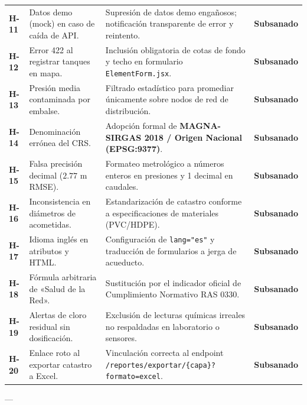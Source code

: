 \documentclass[11pt,letterpaper]{article}
\begin{document}
\begin{tabularx}{\textwidth}{p{1.2cm}p{4.2cm}p{6.8cm}c}
\rowcolor{LightGray}
\textbf{H-11} & Datos demo (mock) en caso de caída de API. & Supresión de datos demo engañosos; notificación transparente de error y reintento. & \textcolor{AlertGreen}{\textbf{Subsanado}} \\
\textbf{H-12} & Error 422 al registrar tanques en mapa. & Inclusión obligatoria de cotas de fondo y techo en formulario \texttt{ElementForm.jsx}. & \textcolor{AlertGreen}{\textbf{Subsanado}} \\
\rowcolor{LightGray}
\textbf{H-13} & Presión media contaminada por embalse. & Filtrado estadístico para promediar únicamente sobre nodos de red de distribución. & \textcolor{AlertGreen}{\textbf{Subsanado}} \\
\textbf{H-14} & Denominación errónea del CRS. & Adopción formal de \textbf{MAGNA-SIRGAS 2018 / Origen Nacional (EPSG:9377)}. & \textcolor{AlertGreen}{\textbf{Subsanado}} \\
\rowcolor{LightGray}
\textbf{H-15} & Falsa precisión decimal ($2.77\text{ m}$ RMSE). & Formateo metrológico a números enteros en presiones y 1 decimal en caudales. & \textcolor{AlertGreen}{\textbf{Subsanado}} \\
\textbf{H-16} & Inconsistencia en diámetros de acometidas. & Estandarización de catastro conforme a especificaciones de materiales (PVC/HDPE). & \textcolor{AlertGreen}{\textbf{Subsanado}} \\
\rowcolor{LightGray}
\textbf{H-17} & Idioma inglés en atributos y HTML. & Configuración de \texttt{lang="es"} y traducción de formularios a jerga de acueducto. & \textcolor{AlertGreen}{\textbf{Subsanado}} \\
\textbf{H-18} & Fórmula arbitraria de «Salud de la Red». & Sustitución por el indicador oficial de Cumplimiento Normativo RAS 0330. & \textcolor{AlertGreen}{\textbf{Subsanado}} \\
\rowcolor{LightGray}
\textbf{H-19} & Alertas de cloro residual sin dosificación. & Exclusión de lecturas químicas irreales no respaldadas en laboratorio o sensores. & \textcolor{AlertGreen}{\textbf{Subsanado}} \\
\textbf{H-20} & Enlace roto al exportar catastro a Excel. & Vinculación correcta al endpoint \texttt{/reportes/exportar/\{capa\}?formato=excel}. & \textcolor{AlertGreen}{\textbf{Subsanado}} \\
\bottomrule
\end{tabularx}

\vspace{1.5em}

---
\end{document}
